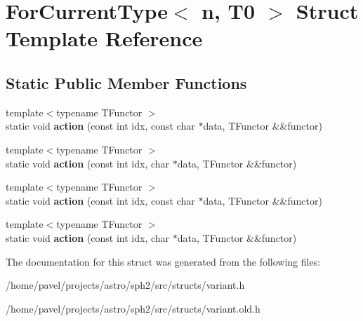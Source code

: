 \hypertarget{structForCurrentType_3_01n_00_01T0_01_4}{}\section{For\+Current\+Type$<$ n, T0 $>$ Struct Template Reference}
\label{structForCurrentType_3_01n_00_01T0_01_4}
\subsection*{Static Public Member Functions}
\begin{DoxyCompactItemize}
\item 
\hypertarget{structForCurrentType_3_01n_00_01T0_01_4_a0fb2ea6a4934702bbe55ccf4d7395af8}{}\label{structForCurrentType_3_01n_00_01T0_01_4_a0fb2ea6a4934702bbe55ccf4d7395af8} 
{\footnotesize template$<$typename T\+Functor $>$ }\\static void {\bfseries action} (const int idx, const char $\ast$data, T\+Functor \&\&functor)
\item 
\hypertarget{structForCurrentType_3_01n_00_01T0_01_4_ab79902edf58340594116af09d4299bf7}{}\label{structForCurrentType_3_01n_00_01T0_01_4_ab79902edf58340594116af09d4299bf7} 
{\footnotesize template$<$typename T\+Functor $>$ }\\static void {\bfseries action} (const int idx, char $\ast$data, T\+Functor \&\&functor)
\item 
\hypertarget{structForCurrentType_3_01n_00_01T0_01_4_a0fb2ea6a4934702bbe55ccf4d7395af8}{}\label{structForCurrentType_3_01n_00_01T0_01_4_a0fb2ea6a4934702bbe55ccf4d7395af8} 
{\footnotesize template$<$typename T\+Functor $>$ }\\static void {\bfseries action} (const int idx, const char $\ast$data, T\+Functor \&\&functor)
\item 
\hypertarget{structForCurrentType_3_01n_00_01T0_01_4_ab79902edf58340594116af09d4299bf7}{}\label{structForCurrentType_3_01n_00_01T0_01_4_ab79902edf58340594116af09d4299bf7} 
{\footnotesize template$<$typename T\+Functor $>$ }\\static void {\bfseries action} (const int idx, char $\ast$data, T\+Functor \&\&functor)
\end{DoxyCompactItemize}


The documentation for this struct was generated from the following files\+:\begin{DoxyCompactItemize}
\item 
/home/pavel/projects/astro/sph2/src/structs/variant.\+h\item 
/home/pavel/projects/astro/sph2/src/structs/variant.\+old.\+h\end{DoxyCompactItemize}
